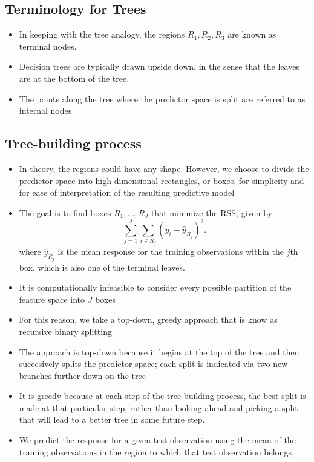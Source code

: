 \documentclass[11pt, a4paper]{article}
\begin{document}
\subsection{Terminology for Trees}
\begin{itemize}
\item In keeping with the tree analogy, the regions $R_1,R_2, R_3$ are known as terminal nodes.
\item Decision trees are typically drawn upside down, in the sense that the leaves are at the bottom of the tree.
\item The points along the tree where the predictor space is split are referred to as internal nodes
\end{itemize}
\subsection{Tree-building process}
\begin{itemize}
\item In theory, the regions could have any shape. However, we choose to divide the predictor space into high-dimensional rectangles, or boxes, for simplicity and for ease of interpretation of the resulting predictive model
\item The goal is to find boxes $R_1,\dots,R_J$ that minimize the RSS, given by
\[
  \sum_{j=1}^J\sum_{i\in R_j} (y_i-\hat{y}_{R_j})^2.  
\]
where $\hat{y}_{R_j}$ is the mean response for the training observations within the $j$th box, which is also one of the terminal leaves.
\item It is computationally infeasible to consider every possible partition of the feature space into $J$ boxes
\item For this reason, we take a top-down, greedy approach that is know as recursive binary splitting
\item The approach is top-down because it begins at the top of the tree and then succesively splits the predictor space; each split is indicated via two new branches further down on the tree
\item It is greedy because at each step of the tree-building process, the best split is made at that particular step, rather than looking ahead and picking a split that will lead to a better tree in some future step.
\item We predict the response for a given test observation using the mean of the training observations in the region to which that test observation belongs.
\end{itemize}
\end{document}
